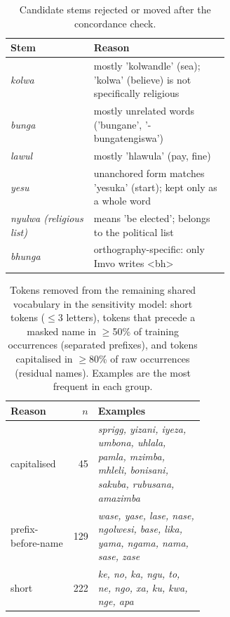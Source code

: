 \begin{table}[h]\centering\small\caption{Candidate stems rejected or moved after the concordance check.}
\begin{tabular}{@{}lp{0.62\linewidth}@{}}\toprule Stem & Reason \\ \midrule
\emph{kolwa} & mostly 'kolwandle' (sea); 'kolwa' (believe) is not specifically religious \\
\emph{bunga} & mostly unrelated words ('bungane', '-bungatengiswa') \\
\emph{lawul} & mostly 'hlawula' (pay, fine) \\
\emph{yesu} & unanchored form matches 'yesuka' (start); kept only as a whole word \\
\emph{nyulwa (religious list)} & means 'be elected'; belongs to the political list \\
\emph{bhunga} & orthography-specific: only Imvo writes <bh> \\
\bottomrule\end{tabular}\label{tab:rejected}\end{table}
\begin{table}[h]\centering\small\caption{Tokens removed from the remaining shared vocabulary in the sensitivity model: short tokens ($\leq$3 letters), tokens that precede a masked name in $\geq$50\% of training occurrences (separated prefixes), and tokens capitalised in $\geq$80\% of raw occurrences (residual names). Examples are the most frequent in each group.}
\begin{tabular}{@{}lrp{0.55\linewidth}@{}}\toprule Reason & $n$ & Examples \\ \midrule
capitalised & 45 & \emph{sprigg, yizani, iyeza, umbona, uhlala, pamla, mzimba, mhleli, bonisani, sakuba, rubusana, amazimba} \\
prefix-before-name & 129 & \emph{wase, yase, lase, nase, ngolwesi, base, lika, yama, ngama, nama, sase, zase} \\
short & 222 & \emph{ke, no, ka, ngu, to, ne, ngo, xa, ku, kwa, nge, apa} \\
\bottomrule\end{tabular}\label{tab:excluded}\end{table}
